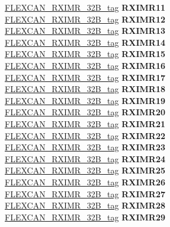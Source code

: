 \begin{DoxyCompactItemize}
\begin{tabbing}
\>\>\mbox{\hyperlink{unionFLEXCAN__RXIMR__32B__tag}{FLEXCAN\_RXIMR\_32B\_tag}} {\bfseries RXIMR11}\\
\>\>\mbox{\hyperlink{unionFLEXCAN__RXIMR__32B__tag}{FLEXCAN\_RXIMR\_32B\_tag}} {\bfseries RXIMR12}\\
\>\>\mbox{\hyperlink{unionFLEXCAN__RXIMR__32B__tag}{FLEXCAN\_RXIMR\_32B\_tag}} {\bfseries RXIMR13}\\
\>\>\mbox{\hyperlink{unionFLEXCAN__RXIMR__32B__tag}{FLEXCAN\_RXIMR\_32B\_tag}} {\bfseries RXIMR14}\\
\>\>\mbox{\hyperlink{unionFLEXCAN__RXIMR__32B__tag}{FLEXCAN\_RXIMR\_32B\_tag}} {\bfseries RXIMR15}\\
\>\>\mbox{\hyperlink{unionFLEXCAN__RXIMR__32B__tag}{FLEXCAN\_RXIMR\_32B\_tag}} {\bfseries RXIMR16}\\
\>\>\mbox{\hyperlink{unionFLEXCAN__RXIMR__32B__tag}{FLEXCAN\_RXIMR\_32B\_tag}} {\bfseries RXIMR17}\\
\>\>\mbox{\hyperlink{unionFLEXCAN__RXIMR__32B__tag}{FLEXCAN\_RXIMR\_32B\_tag}} {\bfseries RXIMR18}\\
\>\>\mbox{\hyperlink{unionFLEXCAN__RXIMR__32B__tag}{FLEXCAN\_RXIMR\_32B\_tag}} {\bfseries RXIMR19}\\
\>\>\mbox{\hyperlink{unionFLEXCAN__RXIMR__32B__tag}{FLEXCAN\_RXIMR\_32B\_tag}} {\bfseries RXIMR20}\\
\>\>\mbox{\hyperlink{unionFLEXCAN__RXIMR__32B__tag}{FLEXCAN\_RXIMR\_32B\_tag}} {\bfseries RXIMR21}\\
\>\>\mbox{\hyperlink{unionFLEXCAN__RXIMR__32B__tag}{FLEXCAN\_RXIMR\_32B\_tag}} {\bfseries RXIMR22}\\
\>\>\mbox{\hyperlink{unionFLEXCAN__RXIMR__32B__tag}{FLEXCAN\_RXIMR\_32B\_tag}} {\bfseries RXIMR23}\\
\>\>\mbox{\hyperlink{unionFLEXCAN__RXIMR__32B__tag}{FLEXCAN\_RXIMR\_32B\_tag}} {\bfseries RXIMR24}\\
\>\>\mbox{\hyperlink{unionFLEXCAN__RXIMR__32B__tag}{FLEXCAN\_RXIMR\_32B\_tag}} {\bfseries RXIMR25}\\
\>\>\mbox{\hyperlink{unionFLEXCAN__RXIMR__32B__tag}{FLEXCAN\_RXIMR\_32B\_tag}} {\bfseries RXIMR26}\\
\>\>\mbox{\hyperlink{unionFLEXCAN__RXIMR__32B__tag}{FLEXCAN\_RXIMR\_32B\_tag}} {\bfseries RXIMR27}\\
\>\>\mbox{\hyperlink{unionFLEXCAN__RXIMR__32B__tag}{FLEXCAN\_RXIMR\_32B\_tag}} {\bfseries RXIMR28}\\
\>\>\mbox{\hyperlink{unionFLEXCAN__RXIMR__32B__tag}{FLEXCAN\_RXIMR\_32B\_tag}} {\bfseries RXIMR29}\\

\end{tabbing}
\end{DoxyCompactItemize}
